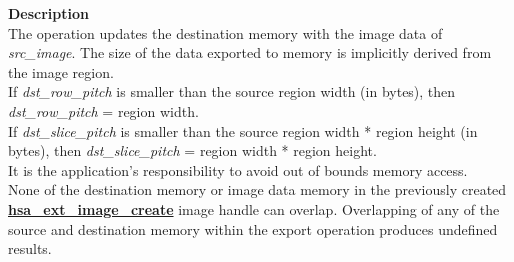 \documentclass[final,oneside]{book}
\newcommand{\reffun}[1]{\textbf{#1}}
\begin{document}
\vspace{-2mm}\noindent\textbf{Description}\\
The operation updates the destination memory with the image data of \textit{src_\-image}. The size of the data exported to memory is implicitly derived from the image region.\\[2mm]
If \textit{dst_\-row_\-pitch} is smaller than the source region width (in bytes), then \textit{dst_\-row_\-pitch} = region width.\\[2mm]
If \textit{dst_\-slice_\-pitch} is smaller than the source region width * region height (in bytes), then \textit{dst_\-slice_\-pitch} = region width * region height.\\[2mm]
It is the application's responsibility to avoid out of bounds memory access.\\[2mm]
None of the destination memory or image data memory in the previously created \hyperlink{group__ext-images_1ga985562c68508d4d8b0edcfd0729b6d49}{\reffun{hsa_\-ext_\-image_\-create}} image handle can overlap. Overlapping of any of the source and destination memory within the export operation produces undefined results. 
\end{document}
